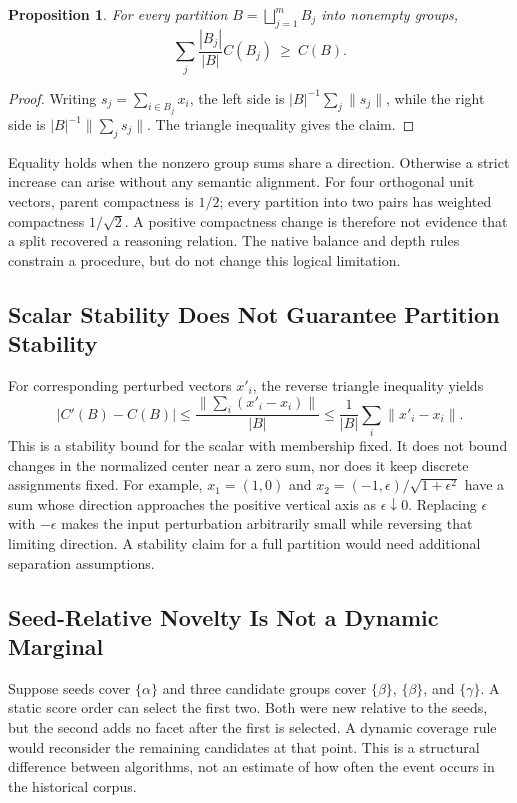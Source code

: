 \documentclass[11pt,a4paper]{article}
\newtheorem{proposition}{Proposition}
\begin{document}
\begin{proposition}
For every partition $B=\bigsqcup_{j=1}^m B_j$ into nonempty groups,
\begin{equation}
\sum_j\frac{|B_j|}{|B|}C(B_j)\ \geq\ C(B).
\label{eq:partition}
\end{equation}
\end{proposition}
\begin{proof}
Writing $s_j=\sum_{i\in B_j}x_i$, the left side is
$|B|^{-1}\sum_j\|s_j\|$, while the right side is
$|B|^{-1}\|\sum_j s_j\|$. The triangle inequality gives the claim.
\end{proof}
Equality holds when the nonzero group sums share a direction. Otherwise a
strict increase can arise without any semantic alignment. For four
orthogonal unit vectors, parent compactness is $1/2$; every partition into
two pairs has weighted compactness $1/\sqrt{2}$. A positive compactness change
is therefore not evidence that a split recovered a reasoning relation.
The native balance and depth rules constrain a procedure, but do not change
this logical limitation.

\subsection{Scalar Stability Does Not Guarantee Partition Stability}
For corresponding perturbed vectors $x'_i$, the reverse triangle inequality
yields
\begin{equation}
|C'(B)-C(B)|\leq\frac{\|\sum_i(x'_i-x_i)\|}{|B|}
\leq\frac{1}{|B|}\sum_i\|x'_i-x_i\|.
\end{equation}
This is a stability bound for the scalar with membership fixed. It does not
bound changes in the normalized center near a zero sum, nor does it keep
discrete assignments fixed. For example, $x_1=(1,0)$ and
$x_2=(-1,\epsilon)/\sqrt{1+\epsilon^2}$ have a sum whose direction approaches
the positive vertical axis as $\epsilon\downarrow0$. Replacing $\epsilon$
with $-\epsilon$ makes the input perturbation arbitrarily small while
reversing that limiting direction. A stability claim for a full partition
would need additional separation assumptions.

\subsection{Seed-Relative Novelty Is Not a Dynamic Marginal}
Suppose seeds cover $\{\alpha\}$ and three candidate groups cover
$\{\beta\}$, $\{\beta\}$, and $\{\gamma\}$. A static score order can select
the first two. Both were new relative to the seeds, but the second adds no
facet after the first is selected. A dynamic coverage rule would reconsider
the remaining candidates at that point. This is a structural difference
between algorithms, not an estimate of how often the event occurs in the
historical corpus.
\end{document}
